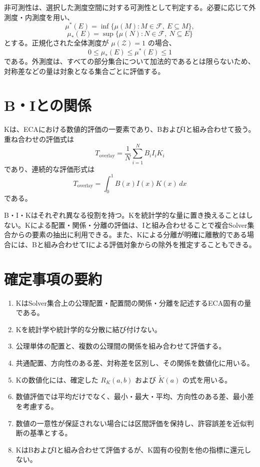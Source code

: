 \documentclass[a4paper,12pt]{article}
\begin{document}
非可測性は、選択した測度空間に対する可測性として判定する。必要に応じて外測度・内測度を用い、
\[
\mu^*(E)
=
\inf\{\mu(M):M\in\mathcal{F},\ E\subseteq M\},
\]
\[
\mu_*(E)
=
\sup\{\mu(N):N\in\mathcal{F},\ N\subseteq E\}
\]
とする。正規化された全体測度が $\mu(\mathcal{Z})=1$ の場合、
\[
0\le\mu_*(E)\le\mu^*(E)\le1
\]
である。外測度は、すべての部分集合について加法的であるとは限らないため、対称差などの量は対象となる集合ごとに評価する。

\section{B・Iとの関係}

Kは、ECAにおける数値的評価の一要素であり、BおよびIと組み合わせて扱う。重ね合わせの評価式は
\[
T_{\mathrm{overlay}}
=
\frac1N\sum_{i=1}^{N}B_iI_iK_i
\]
であり、連続的な評価形式は
\[
T_{\mathrm{overlay}}
=
\int_0^1B(x)I(x)K(x)\,dx
\]
である。

B・I・Kはそれぞれ異なる役割を持つ。Kを統計学的な量に置き換えることはしない。Kによる配置・関係・分離の評価は、Iと組み合わせることで複合Solver集合からの要素の抽出に利用できる。また、Kによる分離が明確に離散的である場合には、Bと組み合わせてIによる評価対象からの除外を推定することもできる。

\section{確定事項の要約}

\begin{enumerate}[label=\arabic*.]
    \item KはSolver集合上の公理配置・配置間の関係・分離を記述するECA固有の量である。
    \item Kを統計学や統計学的な分散に結び付けない。
    \item 公理単体の配置と、複数の公理間の関係を組み合わせて評価する。
    \item 共通配置、方向性のある差、対称差を区別し、その関係を数値化に用いる。
    \item Kの数値化には、確定した $R_K(a,b)$ および $\widetilde K(a)$ の式を用いる。
    \item 数値評価では平均だけでなく、最小・最大・平均、方向性のある差、最小差を考慮する。
    \item 数値の一意性が保証されない場合には区間評価を保持し、許容誤差を近似判断の基準とする。
    \item KはBおよびIと組み合わせて評価するが、K固有の役割を他の指標に還元しない。
\end{enumerate}
\end{document}
